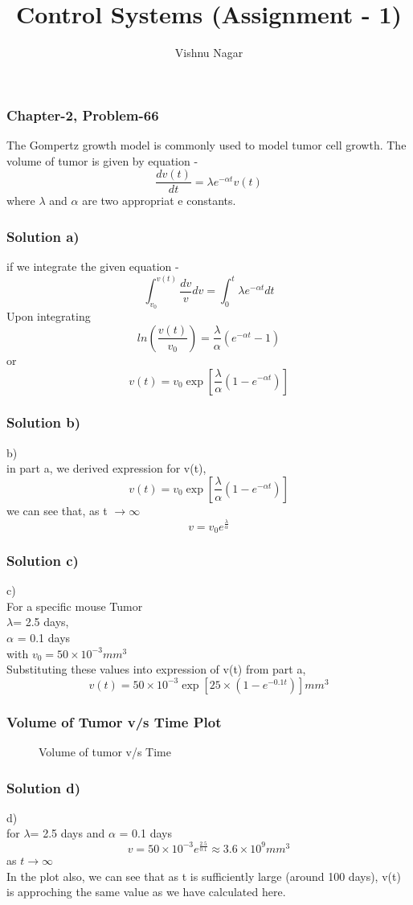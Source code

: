 \documentclass{beamer}
\title[Assignment-1]{Control Systems (Assignment - 1)} %
\author{Vishnu Nagar} %
\institute[IIT Hyderabad] %
{

\medskip
\textit{ME18BTECH11053} %
}
\begin{document}
\begin{frame}
\titlepage %
\end{frame}

\begin{frame}
\frametitle{Chapter-2, Problem-66}
The Gompertz growth model is commonly used to model tumor cell growth. The volume of tumor  is given by equation - $$\frac{dv(t)}{dt} = \lambda e^{-\alpha t}v(t)$$
where $\lambda$ and $\alpha$ are two appropriat e constants.
\end{frame}

\begin{frame}
\frametitle{Solution a)}
if we integrate the given equation - 
$$	\int_{v_0}^{v(t)} \frac{dv}{v} dv = \int_0^t \lambda e^{-\alpha t} dt $$
Upon integrating
$$ln(\frac{v(t)}{v_0}) = \frac{\lambda}{\alpha}(e^{-\alpha t} - 1)$$
or
$$ v(t) = v_0\exp[\frac{\lambda}{\alpha}(1 - e^{-\alpha t})]$$

\end{frame}

\begin{frame}
\frametitle{Solution b)}
b)\\
in part a, we derived expression for v(t),
 $$ v(t) = v_0\exp[\frac{\lambda}{\alpha}(1 - e^{-\alpha t})]$$
we can see that, as t $\rightarrow \infty $
		$$ v = v_0e^{\frac{\lambda}{\alpha}}$$
\end{frame}
\begin{frame}
\frametitle{Solution c)}
c)\\
For a specific mouse Tumor\\
$ \lambda $= 2.5 days,\\
$\alpha$ = 0.1 days \\
with $ v_0  = 50 \times 10^{-3} mm^3 $\\
Substituting these values into expression of v(t) from part a,
	$$v(t) = 50 \times 10^{-3}\exp[25 \times (1 - e^{-0.1t})]  mm^3$$
\end{frame}
\begin{frame}
\frametitle{Volume of Tumor v/s Time Plot}
\begin{figure}[H]
\centering

\caption[Optional caption]{Volume of tumor v/s Time}
\end{figure}
\end{frame}
\begin{frame}
\frametitle{Solution d)}
d)\\
for $\lambda $= 2.5 days and $\alpha$ = 0.1 days \\
 $$v = 50 \times 10^{-3}e^{\frac{2.5}{0.1}} \approx 3.6 \times 10^{9} mm^3$$
 as $t \rightarrow \infty $\\
In the plot also, we can see that as t is sufficiently large (around 100 days), v(t) is approching the same value as we have calculated here.
\end{frame}
\end{document}
